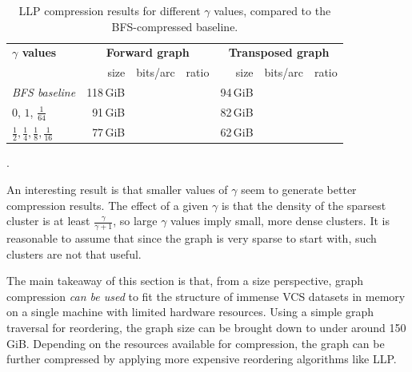 \begin{table}
  \centering
  \caption{LLP compression results for different $\gamma$ values, compared to
    the BFS-compressed baseline.}%
  \label{tab:compression-llp-gammas}

  \renewcommand{\arraystretch}{1.5}
  \begin{tabular}{l r r r r r r}
      \hline \textbf{$\gamma$ values} \hspace{4em}
      & \multicolumn{3}{c}{\textbf{Forward graph}}
      & \multicolumn{3}{c}{\textbf{Transposed graph}} \\

      & size & bits/arc & ratio
      & size & bits/arc & ratio \\

      \hline \emph{BFS baseline}
      & 118\,GiB & \TODO{} & \TODO{}
      & 94\,GiB & \TODO{} & \TODO{} \\

      \hline $0$, $1$, $\frac{1}{64}$
      & 91\,GiB & \TODO{} & \TODO{}
      & 82\,GiB & \TODO{} & \TODO{} \\

      \hline $\frac{1}{2}, \frac{1}{4}, \frac{1}{8}, \frac{1}{16}$
      & 77\,GiB & \TODO{} & \TODO{}
      & 62\,GiB & \TODO{} & \TODO{} \\
    \hline
  \end{tabular}
\end{table}

.

An interesting result is that smaller values of $\gamma$ seem to generate
better compression results.
The effect of a given $\gamma$ is that the density of the sparsest cluster is
at least $\frac{\gamma}{\gamma+1}$, so large $\gamma$ values imply small, more
dense clusters.  It is reasonable to assume that since the graph is very sparse
to start with, such clusters are not that useful.

\bigskip

The main takeaway of this section is that, from a size perspective, graph
compression \emph{can be used} to fit the structure of immense VCS datasets in
memory on a single machine with limited hardware resources. Using a simple
graph traversal for reordering, the graph size can be brought down to under
around 150 GiB. Depending on the resources available for compression, the
graph can be further compressed by applying more expensive reordering
algorithms like \gls{LLP}.


